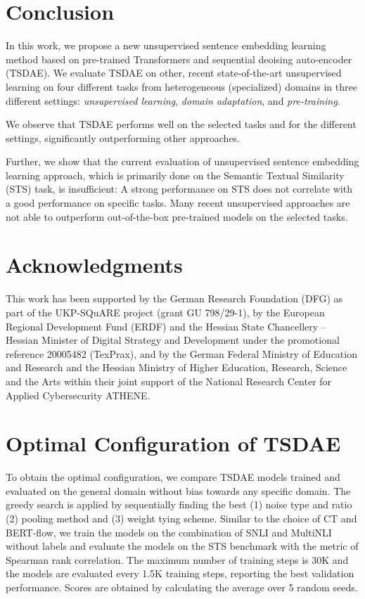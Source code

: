\documentclass[11pt]{article}
\begin{document}
\section{Conclusion}
In this work, we propose a new unsupervised sentence embedding learning method based on pre-trained Transformers and sequential deoising auto-encoder (TSDAE). We evaluate TSDAE on other, recent state-of-the-art unsupervised learning on four different tasks from heterogeneous (specialized) domains in three different settings: \textit{unsupervised learning}, \textit{domain adaptation}, and \textit{pre-training}.

We observe that TSDAE performs well on the selected tasks and for the different settings, significantly outperforming other approaches.

Further, we show that the current evaluation of unsupervised sentence embedding learning approach, which is primarily done on the Semantic Textual Similarity (STS) task, is insufficient: A strong performance on STS does not correlate with a good performance on specific tasks. Many recent unsupervised approaches are not able to outperform out-of-the-box pre-trained models on the selected tasks.





\section*{Acknowledgments}
This work has been supported by the German Research Foundation (DFG) as part of the UKP-SQuARE project (grant GU 798/29-1), by the European Regional Development Fund (ERDF) and the Hessian State Chancellery – Hessian Minister of Digital Strategy and Development under the promotional reference 20005482 (TexPrax), and by the German Federal Ministry of Education and Research and the Hessian Ministry of Higher Education, Research, Science and the Arts within their joint support of the National Research Center for Applied Cybersecurity ATHENE.







\onecolumn
\appendix

\section{Optimal Configuration of TSDAE}
\label{sec:TSDAE_config}
To obtain the optimal configuration, we compare TSDAE models trained and evaluated on the general domain without bias towards any specific domain. The greedy search is applied by sequentially finding the best (1) noise type and ratio (2) pooling method and (3) weight tying scheme. Similar to the choice of CT and BERT-flow, we train the models on the combination of SNLI and MultiNLI without labels and evaluate the models on the STS benchmark with the metric of Spearman rank correlation. The maximum number of training steps is 30K and the models are evaluated every 1.5K training steps, reporting the best validation performance. Scores are obtained by calculating the average over 5 random seeds.
\end{document}

